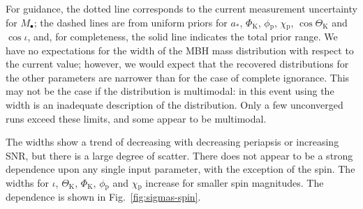 \documentclass[useAMS,usedcolumn,usegraphicx,usenatbib]{mn2e}
\newcommand{\figref}[1]{Fig.~\ref{fig:#1}}
\newcommand{\sub}[1]{\ensuremath{_\mathrm{#1}}}
\begin{document}
For guidance, the dotted line corresponds to the current measurement uncertainty for $M_\bullet$; the dashed lines are from uniform priors for $a_\ast$, $\Phi\sub{K}$, $\phi\sub{p}$, $\chi\sub{p}$, $\cos\Theta\sub{K}$ and $\cos\iota$, and, for completeness, the solid line indicates the total prior range. We have no expectations for the width of the MBH mass distribution with respect to the current value; however, we would expect that the recovered distributions for the other parameters are narrower than for the case of complete ignorance. This may not be the case if the distribution is multimodal: in this event using the width is an inadequate description of the distribution. Only a few unconverged runs exceed these limits, and some appear to be multimodal.

The widths show a trend of decreasing with decreasing periapsis or increasing SNR, but there is a large degree of scatter. There does not appear to be a strong dependence upon any single input parameter, with the exception of the spin. The widths for $\iota$, $\Theta\sub{K}$, $\Phi\sub{K}$, $\phi\sub{p}$ and $\chi\sub{p}$ increase for smaller spin magnitudes. The dependence is shown in \figref{sigmas-spin}.
\end{document}
